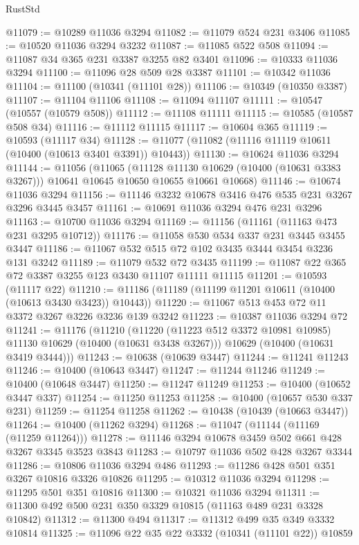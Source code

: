 \begin{lexlean}{RustStd}
\begin{coremodule}
@11079 := @10289 @11036 @3294
@11082 := @11079 @524 @231 @3406
@11085 := @10520 @11036 @3294 @3232
@11087 := @11085 @522 @508
@11094 := @11087 @34 @365 @231 @3387 @3255 @82 @3401
@11096 := @10333 @11036 @3294
@11100 := @11096 @28 @509 @28 @3387
@11101 := @10342 @11036
@11104 := @11100 (@10341 (@11101 @28))
@11106 := @10349 (@10350 @3387)
@11107 := @11104 @11106
@11108 := @11094 @11107
@11111 := @10547 (@10557 (@10579 @508))
@11112 := @11108 @11111
@11115 := @10585 (@10587 @508 @34)
@11116 := @11112 @11115
@11117 := @10604 @365
@11119 := @10593 (@11117 @34)
@11128 := @11077 (@11082 (@11116 @11119 @10611 (@10400 (@10613 @3401 @3391)) @10443))
@11130 := @10624 @11036 @3294
@11144 := @11056
    (@11065
      (@11128 @11130 @10629 (@10400 (@10631 @3383 @3267)))
      @10641
      @10645
      @10650
      @10655
      @10661
      @10668)
@11146 := @10674 @11036 @3294
@11156 := @11146 @3232 @10678 @3416 @476 @535 @231 @3267 @3296 @3445 @3457
@11161 := @10691 @11036 @3294 @476 @231 @3296
@11163 := @10700 @11036 @3294
@11169 := @11156 (@11161 (@11163 @473 @231 @3295 @10712))
@11176 := @11058 @530 @534 @337 @231 @3445 @3455 @3447
@11186 := @11067 @532 @515 @72 @102 @3435 @3444 @3454 @3236 @131 @3242
@11189 := @11079 @532 @72 @3435
@11199 := @11087 @22 @365 @72 @3387 @3255 @123 @3430 @11107 @11111 @11115
@11201 := @10593 (@11117 @22)
@11210 := @11186 (@11189 (@11199 @11201 @10611 (@10400 (@10613 @3430 @3423)) @10443))
@11220 := @11067 @513 @453 @72 @11 @3372 @3267 @3226 @3236 @139 @3242
@11223 := @10387 @11036 @3294 @72
@11241 := @11176
    (@11210
      (@11220 (@11223 @512 @3372 @10981 @10985) @11130 @10629 (@10400 (@10631 @3438 @3267)))
      @10629
      (@10400 (@10631 @3419 @3444)))
@11243 := @10638 (@10639 @3447)
@11244 := @11241 @11243
@11246 := @10400 (@10643 @3447)
@11247 := @11244 @11246
@11249 := @10400 (@10648 @3447)
@11250 := @11247 @11249
@11253 := @10400 (@10652 @3447 @337)
@11254 := @11250 @11253
@11258 := @10400 (@10657 @530 @337 @231)
@11259 := @11254 @11258
@11262 := @10438 (@10439 (@10663 @3447))
@11264 := @10400 (@11262 @3294)
@11268 := @11047 (@11144 (@11169 (@11259 @11264)))
@11278 := @11146 @3294 @10678 @3459 @502 @661 @428 @3267 @3345 @3523 @3843
@11283 := @10797 @11036 @502 @428 @3267 @3344
@11286 := @10806 @11036 @3294 @486
@11293 := @11286 @428 @501 @351 @3267 @10816 @3326 @10826
@11295 := @10312 @11036 @3294
@11298 := @11295 @501 @351 @10816
@11300 := @10321 @11036 @3294
@11311 := @11300 @492 @500 @231 @350 @3329 @10815 (@11163 @489 @231 @3328 @10842)
@11312 := @11300 @494
@11317 := @11312 @499 @35 @349 @3332 @10814
@11325 := @11096 @22 @35 @22 @3332 (@10341 (@11101 @22)) @10859

\end{coremodule}
\end{lexlean}
